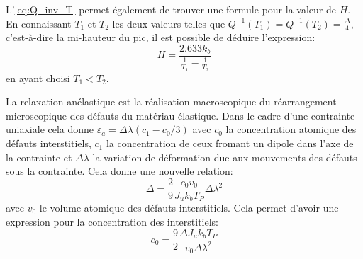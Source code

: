 L'\autoref{eq:Q_inv_T} permet également de trouver une formule pour la valeur de $H$. En connaissant $T_1$ et $T_2$ les deux valeurs telles que $Q^{-1}(T_1) = Q^{-1}(T_2) = \frac{\Delta}{4}$, c'est-à-dire la mi-hauteur du pic, il est possible de déduire l'expression:
\begin{equation}
    H = \frac{2.633 k_b}{\frac{1}{T_1} - \frac{1}{T_2}}
    \label{eq:H_mi_hauteur}
\end{equation}
en ayant choisi $T_1 < T_2$.


La relaxation anélastique est la réalisation macroscopique du réarrangement microscopique des défauts du matériau élastique. Dans le cadre d'une contrainte uniaxiale cela donne \hbox{$\varepsilon_a = \Delta\lambda\left(c_1 - c_0/3\right)$} avec $c_0$ la concentration atomique des défauts interstitiels, $c_1$ la concentration de ceux fromant un dipole dans l'axe de la contrainte et $\Delta\lambda$ la variation de déformation due aux mouvements des défauts sous la contrainte. Cela donne une nouvelle relation:
\begin{equation}
    \Delta = \frac{2}{9}\frac{c_0 v_0}{J_u k_b T_P}\Delta\lambda^2
    \label{eq:delta_defauts}
\end{equation}
avec $v_0$ le volume atomique des défauts interstitiels.
Cela permet d'avoir une expression pour la concentration des interstitiels:
\begin{equation}
    c_0 = \frac{9}{2}\frac{\Delta J_u k_b T_P}{v_0 \Delta \lambda^2}
    \label{eq:c_0}
\end{equation}